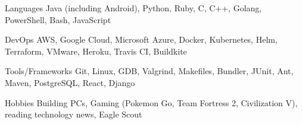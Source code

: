 

\begin{cvskills}


  \cvskill
    {Languages} %
    {Java (including Android), Python, Ruby, C, C++, Golang, PowerShell, Bash, JavaScript} %

  \cvskill
    {DevOps} %
    {AWS, Google Cloud, Microsoft Azure, Docker, Kubernetes, Helm, Terraform, VMware, Heroku, Travis CI, Buildkite} %
    
  \cvskill
    {Tools/Frameworks} %
    {Git, Linux, GDB, Valgrind, Makefiles, Bundler, JUnit, Ant, Maven, PostgreSQL, React, Django} %

  \cvskill
  {Hobbies} %
  {Building PCs, Gaming (Pokemon Go, Team Fortress 2, Civilization V), reading technology news, Eagle Scout} %

\end{cvskills}
